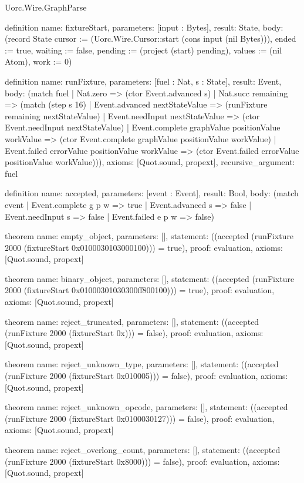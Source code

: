 \begin{lexlean}{Uorc.Wire.GraphParse}
\begin{semanticmodule}
definition{
  name: fixtureStart,
  parameters: [input : Bytes],
  result: State,
  body: (record State {cursor := (Uorc.Wire.Cursor::start (cons input (nil Bytes))), ended := true, waiting := false, pending := (project (start) pending), values := (nil Atom), work := 0})
}

definition{
  name: runFixture,
  parameters: [fuel : Nat, s : State],
  result: Event,
  body: (match fuel
    | Nat.zero => (ctor Event.advanced s)
    | Nat.succ remaining => (match (step s 16)
      | Event.advanced nextStateValue => (runFixture remaining nextStateValue)
      | Event.needInput nextStateValue => (ctor Event.needInput nextStateValue)
      | Event.complete graphValue positionValue workValue => (ctor Event.complete graphValue positionValue workValue)
      | Event.failed errorValue positionValue workValue => (ctor Event.failed errorValue positionValue workValue))),
  axioms: [Quot.sound, propext],
  recursive_argument: fuel
}

definition{
  name: accepted,
  parameters: [event : Event],
  result: Bool,
  body: (match event
    | Event.complete g p w => true
    | Event.advanced s => false
    | Event.needInput s => false
    | Event.failed e p w => false)
}

theorem{
  name: empty_object,
  parameters: [],
  statement: ((accepted (runFixture 2000 (fixtureStart 0x0100030103000100))) = true),
  proof: evaluation{},
  axioms: [Quot.sound, propext]
}

theorem{
  name: binary_object,
  parameters: [],
  statement: ((accepted (runFixture 2000 (fixtureStart 0x01000301030300ff800100))) = true),
  proof: evaluation{},
  axioms: [Quot.sound, propext]
}

theorem{
  name: reject_truncated,
  parameters: [],
  statement: ((accepted (runFixture 2000 (fixtureStart 0x))) = false),
  proof: evaluation{},
  axioms: [Quot.sound, propext]
}

theorem{
  name: reject_unknown_type,
  parameters: [],
  statement: ((accepted (runFixture 2000 (fixtureStart 0x010005))) = false),
  proof: evaluation{},
  axioms: [Quot.sound, propext]
}

theorem{
  name: reject_unknown_opcode,
  parameters: [],
  statement: ((accepted (runFixture 2000 (fixtureStart 0x0100030127))) = false),
  proof: evaluation{},
  axioms: [Quot.sound, propext]
}

theorem{
  name: reject_overlong_count,
  parameters: [],
  statement: ((accepted (runFixture 2000 (fixtureStart 0x8000))) = false),
  proof: evaluation{},
  axioms: [Quot.sound, propext]
}


\end{semanticmodule}
\end{lexlean}
